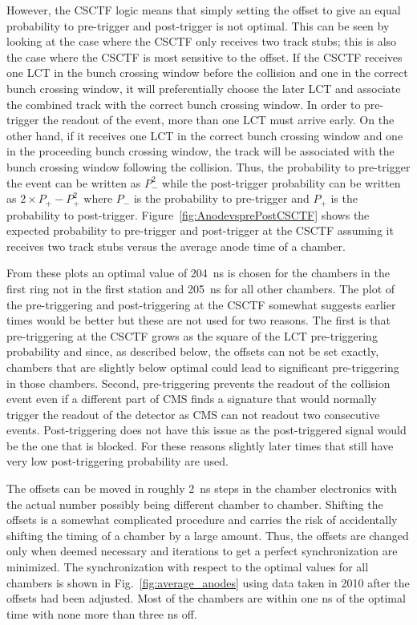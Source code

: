 However, the CSCTF logic means that simply setting the offset to give an equal probability to pre-trigger and post-trigger is not optimal. This can be seen by looking at
the case where the CSCTF only receives two track stubs; this is also the case where the CSCTF is most sensitive to the offset. If the CSCTF receives one LCT in the bunch
crossing window before the collision and one in the correct bunch crossing window, it will preferentially choose the later LCT and associate the combined track with the correct
bunch crossing window.  In order to pre-trigger the readout of the event, more than one LCT must arrive early.
On the other hand, if it receives one LCT in the correct bunch crossing window and one in the proceeding bunch crossing window, the track will be associated with the
bunch crossing window following the collision. Thus, the probability to pre-trigger the event can be written as $P_{-}^2$ while the post-trigger probability can be written as
$2 \times P_{+} - P_{+}^2$ where $P_{-}$ is the probability to pre-trigger and $P_{+}$ is the probability to post-trigger.
Figure~\ref{fig:AnodevsprePostCSCTF} shows the expected probability to pre-trigger and post-trigger at the CSCTF assuming it receives two track stubs versus
the average anode time of a chamber.

From these plots an optimal value of 204~ns is chosen for the chambers in the first ring not in the first station and 205~ns for all other chambers.
The plot of the pre-triggering and post-triggering at the CSCTF somewhat suggests earlier times would be better but these are not used for two reasons.
The first is that pre-triggering at the CSCTF grows as the square of the LCT pre-triggering probability and since, as described below, the offsets can not be set exactly, chambers
that are slightly below optimal could lead to significant pre-triggering in those chambers. Second, pre-triggering prevents the readout
of the collision event even if a different part of CMS finds a signature that would normally trigger the readout of the detector as
CMS can not readout two consecutive events. Post-triggering does not have this issue as the post-triggered signal would be the one that is blocked.
For these reasons slightly later times that still have very low post-triggering probability are used.

The offsets can be moved in roughly 2~ns steps in the chamber electronics with the actual number possibly being different chamber to chamber. Shifting the offsets is a
somewhat complicated procedure and carries the risk of accidentally shifting the timing of a chamber by a large amount. Thus, the offsets are changed only
when deemed necessary and iterations to get a perfect synchronization are minimized. The synchronization with respect to the optimal values for all chambers
is shown in Fig.~\ref{fig:average_anodes} using data taken in 2010 after the offsets had been adjusted.
Most of the chambers are within one ns of the optimal time with none more than three ns off.

